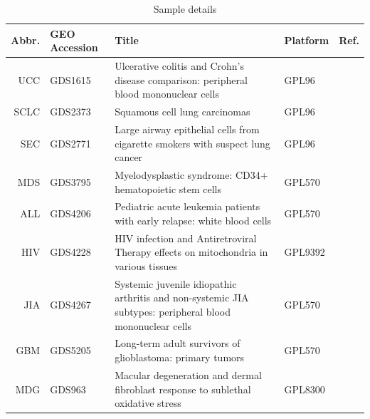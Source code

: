 \documentclass{article}
\begin{document}
\begin{table}
	\caption{Sample details}
	\label{samples-details}
	\centering
	\begin{tabulary}{\linewidth}{rlLll}
		\toprule
		Abbr. & GEO Accession & Title & Platform & Ref. \\
		\midrule
		UCC & GDS1615 & Ulcerative colitis and Crohn's disease comparison: peripheral blood mononuclear cells & GPL96 & \cite{UCC_paper} \\
		SCLC & GDS2373 & Squamous cell lung carcinomas \vspace{\baselineskip} & GPL96 & \cite{SCLC_paper} \\
		SEC & GDS2771 & Large airway epithelial cells from cigarette smokers with suspect lung cancer & GPL96 & \cite{SEC_paper} \\
		MDS & GDS3795 & Myelodysplastic syndrome: CD34+ hematopoietic stem cells & GPL570 & \cite{MDS_paper} \\
		ALL & GDS4206 & Pediatric acute leukemia patients with early relapse: white blood cells & GPL570 & \cite{ALL_paper} \\
		HIV & GDS4228 & HIV infection and Antiretroviral Therapy effects on mitochondria in various tissues & GPL9392 & \cite{HIV_paper} \\
		JIA & GDS4267 & Systemic juvenile idiopathic arthritis and non-systemic JIA subtypes: peripheral blood mononuclear cells & GPL570 & \cite{JIA_paper} \\
		GBM & GDS5205 & Long-term adult survivors of glioblastoma: primary tumors & GPL570 & \cite{GBM_paper} \\
		MDG & GDS963 & Macular degeneration and dermal fibroblast response to sublethal oxidative stress & GPL8300 & \cite{MDG_paper} \\
		\bottomrule
	\end{tabulary}
\end{table}
\end{document}
